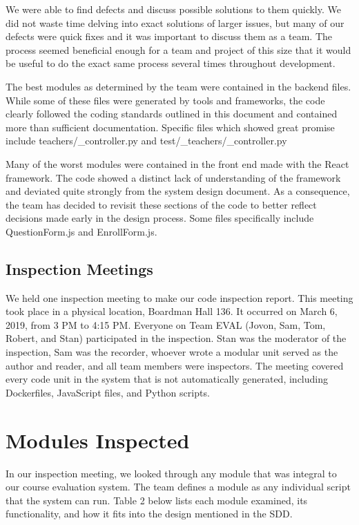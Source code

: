 \documentclass{article}
\begin{document}
We were able to find defects and discuss possible solutions to them quickly. We did not waste time delving into exact solutions of larger issues, but many of our defects were quick fixes and it was important to discuss them as a team. The process seemed beneficial enough for a team and project of this size that it would be useful to do the exact same process several times throughout development.

The best modules as determined by the team were contained in the backend files. While some of these files were generated by tools and frameworks, the code clearly followed the coding standards outlined in this document and contained more than sufficient documentation. Specific files which showed great promise include teachers/_controller.py and test/_teachers/_controller.py

Many of the worst modules were contained in the front end made with the React framework. The code showed a distinct lack of understanding of the framework and deviated quite strongly from the system design document. As a consequence, the team has decided to revisit these sections of the code to better reflect decisions made early in the design process. Some files specifically include QuestionForm.js and EnrollForm.js. 

\subsection{Inspection Meetings}

We held one inspection meeting to make our code inspection report. This meeting took place in a physical location, Boardman Hall 136. It occurred on March 6, 2019, from 3 PM to 4:15 PM. Everyone on Team EVAL (Jovon, Sam, Tom, Robert, and Stan) participated in the inspection. Stan was the moderator of the inspection, Sam was the recorder, whoever wrote a modular unit served as the author and reader, and all team members were inspectors. The meeting covered every code unit in the system that is not automatically generated, including Dockerfiles, JavaScript files, and Python scripts.

\section{Modules Inspected}

In our inspection meeting, we looked through any module that was integral to our course evaluation system. The team defines a module as any individual script that the system can run. Table 2 below lists each module examined, its functionality, and how it fits into the design mentioned in the SDD.
\end{document}
